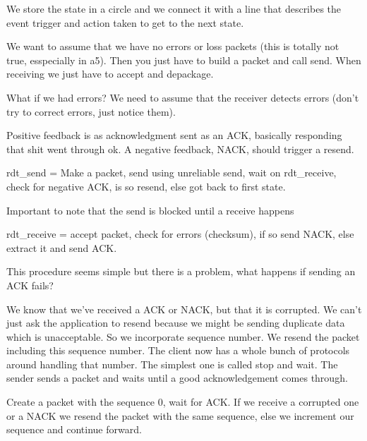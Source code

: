 \documentclass{article}
\begin{document}







We store the state in a circle and we connect it with a line that describes the event trigger and action taken to get to the next state. 


We want to assume that we have no errors or loss packets (this is totally not true, esspecially in a5). Then you just have to build a packet and call send. When receiving we just have to accept and depackage.


What if we had errors? We need to assume that the receiver detects errors (don't try to correct errors, just notice them). 


Positive feedback is as acknowledgment sent as an ACK, basically responding that shit went through ok. A negative feedback, NACK, should trigger a resend.


rdt\_send = Make a packet, send using unreliable send, wait on rdt\_receive, check for negative ACK, is so resend, else got back to first state.

Important to note that the send is blocked until a receive happens

rdt\_receive = accept packet, check for errors (checksum), if so send NACK, else extract it and send ACK.


This procedure seems simple but there is a problem, what happens if sending an ACK fails?




We know that we've received a ACK or NACK, but that it is corrupted. We can't just ask the application to resend because we might be sending duplicate data which is unacceptable. So we incorporate  sequence number. We resend the packet including this sequence number. The client now has a whole bunch of protocols around handling that number. The simplest one is called stop and wait. The sender sends a packet and waits until a good acknowledgement comes through.


Create a packet with the sequence 0, wait for ACK. If we receive a corrupted one or a NACK we resend the packet with the same sequence, else we increment our sequence and continue forward. 
\end{document}
